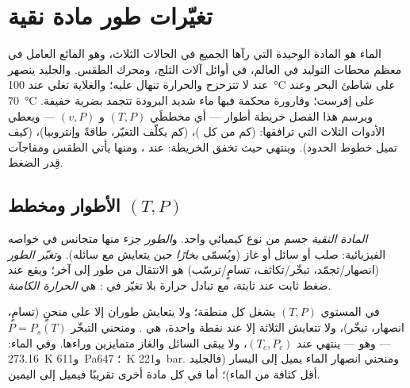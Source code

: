 \chapter{تغيّرات طور مادة نقية}\label{ch:b1:phase-changes}

الماء هو المادة الوحيدة التي رآها الجميع في الحالات الثلاث،
وهو المائع العامل في معظم محطات التوليد في العالم،  في أوائل آلات الثلج، ومحرك الطقس.
والجليد ينصهر عند  لا تتزحزح والحرارة تنهال
عليه؛ والغلاية تغلي عند \qty{100}{\degreeCelsius} على شاطئ البحر وعند
\qty{70}{\degreeCelsius} على إفرست؛ وقارورة محكمة فيها ماء شديد البرودة
تتجمد بضربة خفيفة. ويرسم هذا الفصل خريطة أطوار
 --- أي مخططَي $(T, P)$ و $(v, P)$ --- ويعطي
الأدوات الثلاث التي ترافقها:  (كم من كل )،
 (كم يكلّف التغيّر، طاقةً وإنتروبيا)،  (كيف تميل خطوط الحدود). وينتهي حيث
تخفق الخريطة: عند ، ومنها يأتي الطقس
ومفاجآت قِدر الضغط.

\section{الأطوار ومخطط $(T, P)$}

\begin{definition}\label{def:b1:phase-changes:phase}
\emph{المادة النقية} جسم من نوع كيميائي واحد. و\emph{الطور}
جزء منها متجانس في خواصه الفيزيائية: صلب أو سائل أو غاز
(ويُسمّى \emph{بخارًا} حين يتعايش مع سائله). و\emph{تغيّر الطور}
(انصهار/تجمّد، تبخّر/تكاثف، تسامٍ/ترسّب) هو الانتقال من طور
إلى آخر؛ ويقع عند ضغط ثابت عند  ثابتة، مع تبادل
حرارة بلا تغيّر في : هي \emph{الحرارة الكامنة}.
\end{definition}

\begin{proposition}\label{prop:b1:phase-changes:PTdiagram}
في المستوي $(T, P)$ يشغل كل  منطقة؛ ولا يتعايش طوران
إلا على منحنٍ (تسامٍ، انصهار، تبخّر)، ولا تتعايش الثلاثة إلا
عند نقطة واحدة، هي \emph{}. ومنحني التبخّر
$P = P_s(T)$ --- وهو \emph{} --- ينتهي عند
\emph{} $(T_c, P_c)$، ولا يبقى السائل والغاز
متمايزين وراءها. وفي الماء:  \qty{273.16}{K} و\qty{611}{Pa}؛
 \qty{647}{K} و\qty{221}{bar}. ومنحني انصهار الماء
يميل إلى اليسار (فالجليد أقل كثافة من الماء)؛ أما في كل مادة
أخرى تقريبًا فيميل إلى اليمين.
\end{proposition}
\admitted

